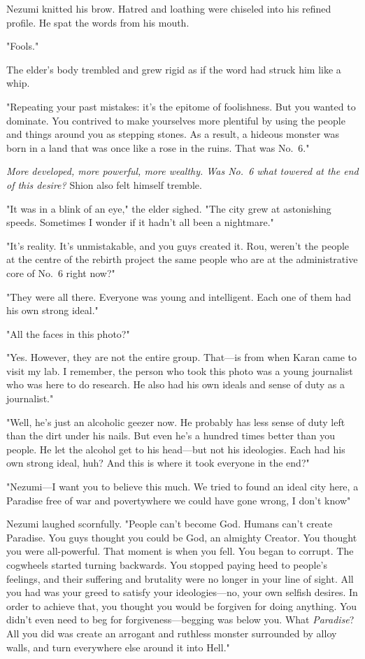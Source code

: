 Nezumi knitted his brow. Hatred and loathing were chiseled into his
refined profile. He spat the words from his mouth.

"Fools."

The elder's body trembled and grew rigid as if the word had struck him
like a whip.

"Repeating your past mistakes: it's the epitome of foolishness. But you
wanted to dominate. You contrived to make yourselves more plentiful by
using the people and things around you as stepping stones. As a result,
a hideous monster was born in a land that was once like a rose in the
ruins. That was No.~6."

\emph{More developed, more powerful, more wealthy. Was No.~6 what towered at
the end of this desire?} Shion also felt himself tremble.

"It was in a blink of an eye," the elder sighed. "The city grew at
astonishing speeds. Sometimes I wonder if it hadn't all been a
nightmare."

"It's reality. It's unmistakable, and you guys created it. Rou, weren't
the people at the centre of the rebirth project the same people who are
at the administrative core of No.~6 right now?"

"They were all there. Everyone was young and intelligent. Each one of
them had his own strong ideal."

"All the faces in this photo?"

"Yes. However, they are not the entire group. That---is from when Karan
came to visit my lab. I remember, the person who took this photo was a
young journalist who was here to do research. He also had his own ideals
and sense of duty as a journalist."

"Well, he's just an alcoholic geezer now. He probably has less sense of
duty left than the dirt under his nails. But even he's a hundred times
better than you people. He let the alcohol get to his head---but not his
ideologies. Each had his own strong ideal, huh? And this is where it
took everyone in the end?"

"Nezumi---I want you to believe this much. We tried to found an ideal city
here, a Paradise free of war and poverty\el where we could have gone
wrong, I don't know\el "

Nezumi laughed scornfully. "People can't become God. Humans can't create
Paradise. You guys thought you could be God, an almighty Creator. You
thought you were all-powerful. That moment is when you fell. You began
to corrupt. The cogwheels started turning backwards. You stopped paying
heed to people's feelings, and their suffering and brutality were no
longer in your line of sight. All you had was your greed to satisfy your
ideologies---no, your own selfish desires. In order to achieve that, you
thought you would be forgiven for doing anything. You didn't even need
to beg for forgiveness---begging was below you. What \emph{Paradise}? All you did
was create an arrogant and ruthless monster surrounded by alloy walls,
and turn everywhere else around it into Hell."

